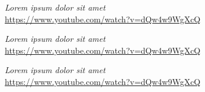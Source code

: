 
\begin{thebibliography}{00}

  \textit{Lorem ipsum dolor sit amet} \\
  \url{https://www.youtube.com/watch?v=dQw4w9WgXcQ}

  \textit{Lorem ipsum dolor sit amet} \\
  \url{https://www.youtube.com/watch?v=dQw4w9WgXcQ}

  \textit{Lorem ipsum dolor sit amet} \\
  \url{https://www.youtube.com/watch?v=dQw4w9WgXcQ}

\end{thebibliography}

